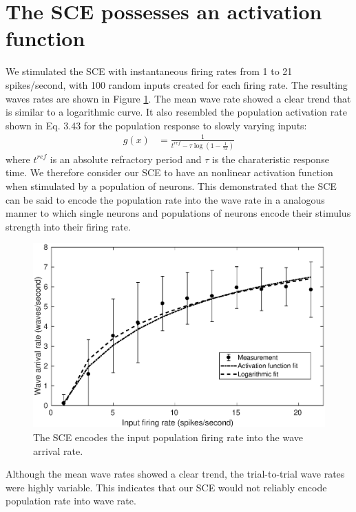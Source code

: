\section{The SCE possesses an activation function}
We stimulated the SCE with instantaneous firing rates from 1 to 21 spikes/second, with 100 random inputs created for each firing rate.
The resulting waves rates are shown in Figure \ref{fig:sce_activation_function}.
The mean wave rate showed a clear trend that is similar to a logarithmic curve. 
It also resembled the population activation rate shown in \citet{Trappenberg2010} Eq. 3.43 for the population response to slowly varying inputs:
\begin{align}
 g(x) &= \frac{1}{t^{ref}-\tau \log{(1-\frac{1}{\tau x})}}
\end{align}
where $t^{ref}$ is an absolute refractory period and $\tau$ is the charateristic response time.
We therefore consider our SCE to have an nonlinear activation function when stimulated by a  population of neurons.
This demonstrated that the SCE can be said to encode the population rate into the wave rate in a analogous manner to which single neurons and populations of neurons encode their stimulus strength into their firing rate.

\begin{figure}[!htb]
 \centering
 \includegraphics[width=\textwidth]{fig/SCE_2x2_FRE}
 \caption{The SCE encodes the input population firing rate into the wave arrival rate. }
 \label{fig:sce_activation_function}
\end{figure}

Although the mean wave rates showed a clear trend, the trial-to-trial wave rates were highly variable. 
This indicates that our SCE would not reliably encode population rate into wave rate.

